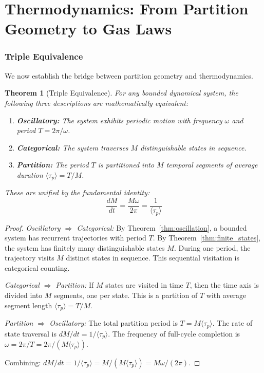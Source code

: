 \documentclass[twocolumn,10pt,a4paper]{article}
\theoremstyle{plain}
\newtheorem{theorem}{Theorem}[section]
\theoremstyle{definition}
\theoremstyle{remark}
\newcommand{\taup}{\tau_p}
\begin{document}
\part{Thermodynamics: From Partition Geometry to Gas Laws}
\label{part:thermo}

\section{Triple Equivalence}
\label{sec:triple}

We now establish the bridge between partition geometry and thermodynamics.

\begin{theorem}[Triple Equivalence]
\label{thm:triple}
For any bounded dynamical system, the following three descriptions are mathematically equivalent:
\begin{enumerate}
    \item \textbf{Oscillatory:} The system exhibits periodic motion with frequency $\omega$ and period $T = 2\pi/\omega$.
    \item \textbf{Categorical:} The system traverses $M$ distinguishable states in sequence.
    \item \textbf{Partition:} The period $T$ is partitioned into $M$ temporal segments of average duration $\langle\taup\rangle = T/M$.
\end{enumerate}
These are unified by the \emph{fundamental identity}:
\begin{equation}
\label{eq:fundamental_identity}
    \frac{dM}{dt} = \frac{M\omega}{2\pi} = \frac{1}{\langle\taup\rangle}
\end{equation}
\end{theorem}

\begin{proof}
\emph{Oscillatory $\Rightarrow$ Categorical:} By Theorem~\ref{thm:oscillation}, a bounded system has recurrent trajectories with period $T$. By Theorem~\ref{thm:finite_states}, the system has finitely many distinguishable states $M$. During one period, the trajectory visits $M$ distinct states in sequence. This sequential visitation is categorical counting.

\emph{Categorical $\Rightarrow$ Partition:} If $M$ states are visited in time $T$, then the time axis is divided into $M$ segments, one per state. This is a partition of $T$ with average segment length $\langle\taup\rangle = T/M$.

\emph{Partition $\Rightarrow$ Oscillatory:} The total partition period is $T = M\langle\taup\rangle$. The rate of state traversal is $dM/dt = 1/\langle\taup\rangle$. The frequency of full-cycle completion is $\omega = 2\pi/T = 2\pi/(M\langle\taup\rangle)$.

Combining: $dM/dt = 1/\langle\taup\rangle = M/(M\langle\taup\rangle) = M\omega/(2\pi)$.
\end{proof}
\end{document}
